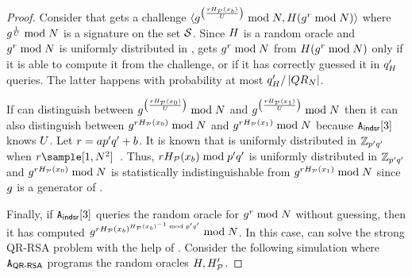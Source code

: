 \begin{proof}


Consider that  gets a challenge $\langle \qrGen^{\left(\frac{\genericRand \primeRO(\genericSetElmt[\indBit])}{\accSet}\right)} \bmod \rsaMod, \ro(\qrGen^{\genericRand} \bmod \rsaMod)\rangle$ where $\qrGen^{\frac{ 
	1}{\accSet}} \bmod \rsaMod$ is a signature on the set $\genericSetVar$. 
Since $H$ is a random oracle and $\qrGen^{\genericRand} \bmod \rsaMod$ is uniformly distributed in 
\qrGroup \cite{cramer2000signature},  gets $\qrGen^{\genericRand} \bmod 
\rsaMod$ from 
$\ro(\qrGen^{\genericRand} \bmod \rsaMod)$ only if it is able to compute it from the challenge, or if it has correctly guessed it in $q_H'$ 
queries. The latter happens with probability at most $q_H' 
/\left|{QR_{N}}\right|$. 

If  can distinguish between $\qrGen^{\left(\frac{\genericRand 		
\primeRO(\genericSetElmt[0])}{\accSet}\right)} \bmod \rsaMod$ and $\qrGen^{\left(\frac{\genericRand 
\primeRO(\genericSetElmt[1])}{\accSet}\right)} \bmod \rsaMod$ then it can also distinguish between 
$\qrGen^{\genericRand \primeRO(\genericSetElmt[0])} \bmod \rsaMod$ and $\qrGen^{\genericRand 
\primeRO(\genericSetElmt[1])} \bmod \rsaMod$ because $\indsrAdversary{3}$ knows $\accSet$.
Let $\genericRand = \modQuotient \qrGroupOrder + 
\modRemainder$. It is known that \modRemainder is uniformly distributed in 
$\mathbb{Z}_{p'q'}$ when $\genericRand \sample \nats[1][\rsaMod^2]$~\cite{cramer2000signature}. Thus, $\genericRand 
\primeRO(\genericSetElmt[\indBit]) \bmod \qrGroupOrder$ is uniformly distributed in 
$\mathbb{Z}_{p'q'}$ 
and $\qrGen^{\genericRand \primeRO(\genericSetElmt[0])} \bmod \rsaMod$ is statistically 
indistinguishable from $\qrGen^{\genericRand \primeRO(\genericSetElmt[1])} \bmod \rsaMod$ since
$g$ is a generator of \qrGroup. 


Finally, if $\indsrAdversary{3}$ queries the random oracle for $\qrGen^{\genericRand} \bmod 
\rsaMod$ without guessing, then it has computed $\qrGen^{\genericRand 
	\primeRO(\genericSetElmt[\indBit])^{\primeRO(\genericSetElmt[\indBit])^{-1} \bmod 
\qrGroupOrder}} \bmod \rsaMod$.  In this case, \rsaAdversary can solve the strong QR-RSA problem 
with the help of \indsrAdversaryComb. Consider the following simulation where $\rsaAdversary$ 
programs the random oracles $H, H_{\mathcal{P}}'$. 


\end{proof}
